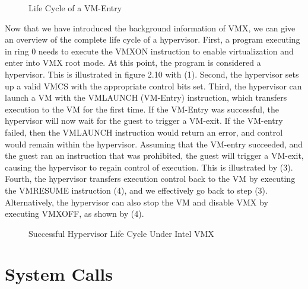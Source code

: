 \documentclass{report}
\begin{document}
\begin{spacing}{1.5}
{}
\begin{figure}[ht]
\hspace*{-3cm}
\centering
  \caption{Life Cycle of a VM-Entry}
\end{figure}


{\large
\noindent Now that we have introduced the background information of VMX, we can give an overview of the complete life cycle of a hypervisor. First, a program executing in ring 0 needs to execute the VMXON instruction to enable virtualization and enter into VMX root mode. At this point, the program is considered a hypervisor. This is illustrated in figure 2.10 with (1). Second, the hypervisor sets up a valid VMCS with the appropriate control bits set. Third, the hypervisor can launch a VM with the VMLAUNCH (VM-Entry) instruction, which transfers execution to the VM for the first time. If the VM-Entry was successful, the hypervisor will now wait for the guest to trigger a VM-exit. If the VM-entry failed, then the VMLAUNCH instruction would return an error, and control would remain within the hypervisor. Assuming that the VM-entry succeeded, and the guest ran an instruction that was prohibited, the guest will trigger a VM-exit, causing the hypervisor to regain control of execution. This is illustrated by (3). Fourth, the hypervisor transfers execution control back to the VM by executing the VMRESUME instruction (4), and we effectively go back to step (3). Alternatively, the hypervisor can also stop the VM and disable VMX by executing VMXOFF, as shown by (4).
\newline


{}
\begin{figure}[ht]
\centering
  \caption{Successful Hypervisor Life Cycle Under Intel VMX}
\end{figure}
}





\section{System Calls}


\end{spacing}
\end{document}
